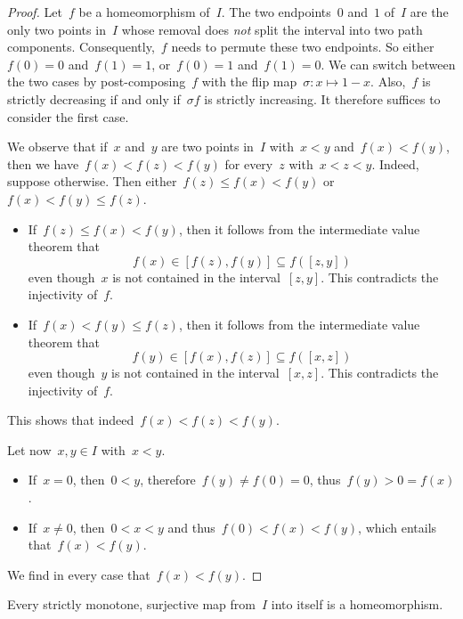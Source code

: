 \begin{proof}
	Let~$f$ be a homeomorphism of~$I$.
	The two endpoints~$0$ and~$1$ of~$I$ are the only two points in~$I$ whose removal does \emph{not} split the interval into two path components.
	Consequently,~$f$ needs to permute these two endpoints.
	So either~$f(0) = 0$ and~$f(1) = 1$, or~$f(0) = 1$ and~$f(1) = 0$.
	We can switch between the two cases by post-composing~$f$ with the flip map~$σ \colon x \mapsto 1 - x$.
	Also,~$f$ is strictly decreasing if and only if~$σ f$ is strictly increasing.
	It therefore suffices to consider the first case.

	We observe that if~$x$ and~$y$ are two points in~$I$ with~$x < y$ and~$f(x) < f(y)$, then we have~$f(x) < f(z) < f(y)$ for every~$z$ with~$x < z < y$.
	Indeed, suppose otherwise.
	Then either~$f(z) ≤ f(x) < f(y)$ or~$f(x) < f(y) ≤ f(z)$.
	\begin{itemize}

		\item
			If~$f(z) ≤ f(x) < f(y)$, then it follows from the intermediate value theorem that
			\[
				f(x) ∈ [f(z), f(y)] ⊆ f([z, y])
			\]
			even though~$x$ is not contained in the interval~$[z, y]$.
			This contradicts the injectivity of~$f$.

		\item
			If~$f(x) < f(y) ≤ f(z)$, then it follows from the intermediate value theorem that
			\[
				f(y) ∈ [f(x), f(z)] ⊆ f([x, z])
			\]
			even though~$y$ is not contained in the interval~$[x, z]$.
			This contradicts the injectivity of~$f$.

	\end{itemize}
	This shows that indeed~$f(x) < f(z) < f(y)$.

	Let now~$x, y ∈ I$ with~$x < y$.
	\begin{itemize}
	
		\item
			If~$x = 0$, then~$0 < y$, therefore~$f(y) ≠ f(0) = 0$, thus~$f(y) > 0 = f(x)$.

		\item
			If~$x ≠ 0$, then~$0 < x < y$ and thus~$f(0) < f(x) < f(y)$, which entails that~$f(x) < f(y)$.

	\end{itemize}
	We find in every case that~$f(x) < f(y)$.
\end{proof}

\begin{lemma}
	Every strictly monotone, surjective map from~$I$ into itself is a homeomorphism.
\end{lemma}


